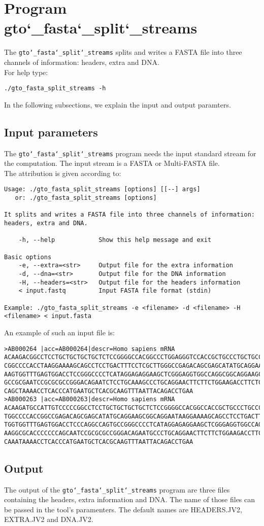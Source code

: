 \section{Program gto\char`_fasta\char`_split\char`_streams}
The \texttt{gto\char`_fasta\char`_split\char`_streams} splits and writes a FASTA file into three channels of information: headers, extra and DNA.\\
For help type:
\begin{lstlisting}
./gto_fasta_split_streams -h
\end{lstlisting}
In the following subsections, we explain the input and output paramters.

\subsection*{Input parameters}

The \texttt{gto\char`_fasta\char`_split\char`_streams} program needs the input standard stream for the computation. The input stream is a FASTA or Multi-FASTA file.\\
The attribution is given according to:
\begin{lstlisting}
Usage: ./gto_fasta_split_streams [options] [[--] args]
   or: ./gto_fasta_split_streams [options]

It splits and writes a FASTA file into three channels of information: headers, extra and DNA.

    -h, --help            Show this help message and exit

Basic options
    -e, --extra=<str>     Output file for the extra information
    -d, --dna=<str>       Output file for the DNA information
    -H, --headers=<str>   Output file for the headers information
    < input.fastq         Input FASTA file format (stdin)

Example: ./gto_fasta_split_streams -e <filename> -d <filename> -H <filename> < input.fasta
\end{lstlisting}
An example of such an input file is:
\begin{lstlisting}
>AB000264 |acc=AB000264|descr=Homo sapiens mRNA 
ACAAGACGGCCTCCTGCTGCTGCTGCTCTCCGGGGCCACGGCCCTGGAGGGTCCACCGCTGCCCTGCTGCCATTGTCCC
CGGCCCCACCTAAGGAAAAGCAGCCTCCTGACTTTCCTCGCTTGGGCCGAGACAGCGAGCATATGCAGGAAGCGGCAGG
AAGTGGTTTGAGTGGACCTCCGGGCCCCTCATAGGAGAGGAAGCTCGGGAGGTGGCCAGGCGGCAGGAAGCAGGCCAGT
GCCGCGAATCCGCGCGCCGGGACAGAATCTCCTGCAAAGCCCTGCAGGAACTTCTTCTGGAAGACCTTCTCCACCCCCC
CAGCTAAAACCTCACCCATGAATGCTCACGCAAGTTTAATTACAGACCTGAA
>AB000263 |acc=AB000263|descr=Homo sapiens mRNA 
ACAAGATGCCATTGTCCCCCGGCCTCCTGCTGCTGCTGCTCTCCGGGGCCACGGCCACCGCTGCCCTGCCCCTGGAGGG
TGGCCCCACCGGCCGAGACAGCGAGCATATGCAGGAAGCGGCAGGAATAAGGAAAAGCAGCCTCCTGACTTTCCTCGCT
TGGTGGTTTGAGTGGACCTCCCAGGCCAGTGCCGGGCCCCTCATAGGAGAGGAAGCTCGGGAGGTGGCCAGGCGGCAGG
AAGGCGCACCCCCCCAGCAATCCGCGCGCCGGGACAGAATGCCCTGCAGGAACTTCTTCTGGAAGACCTTCTCCTCCTG
CAAATAAAACCTCACCCATGAATGCTCACGCAAGTTTAATTACAGACCTGAA
\end{lstlisting}

\subsection*{Output}

The output of the \texttt{gto\char`_fasta\char`_split\char`_streams} program are three files containing the headers, extra information and DNA. The name of those files can be passed in the tool's paramenters. The default names are HEADERS.JV2, EXTRA.JV2 and DNA.JV2. 
